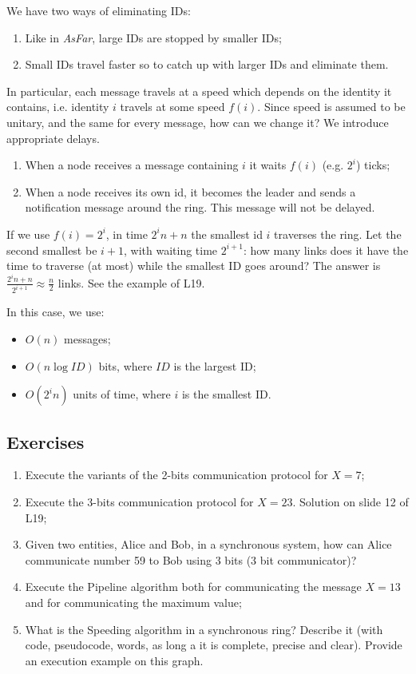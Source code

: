 We have two ways of eliminating IDs:
\begin{enumerate}
    \item Like in \textit{AsFar}, large IDs are stopped by smaller IDs;
    \item Small IDs travel faster so to catch up with larger IDs and eliminate them.
\end{enumerate}

In particular, each message travels at a speed which depends on the identity it contains, i.e. identity $i$ travels at some speed $f(i)$. Since speed is assumed to be unitary, and the same for every message, how can we change it? We introduce appropriate delays.

\begin{enumerate}
    \item When a node receives a message containing $i$ it waits $f(i)$ (e.g. $2^i$) ticks;
    \item When a node receives its own id, it becomes the leader and sends a notification message around the ring. This message will not be delayed.
\end{enumerate}

If we use $f(i) = 2^i$, in time $2^i n + n$ the smallest id $i$ traverses the ring. Let the second smallest be $i+1$, with waiting time $2^{i+1}$: how many links does it have the time to traverse (at most) while the smallest ID goes around? The answer is $\frac{2^in+n}{2^{i+1}} \approx \frac{n}{2}$ links. See the example of L19.

In this case, we use:
\begin{itemize}
    \item $O(n)$ messages;
    \item $O(n \log ID)$ bits, where $ID$ is the largest ID;
    \item $O(2^i n)$ units of time, where $i$ is the smallest ID.
\end{itemize}

\newpage
\subsection{Exercises}
\begin{enumerate}
    \item Execute the variants of the 2-bits communication protocol for $X = 7$;
    \item Execute the 3-bits communication protocol for $X = 23$. Solution on slide 12 of L19;
    \item Given two entities, Alice and Bob, in a synchronous system, how can Alice communicate number 59 to Bob using 3 bits (3 bit communicator)?
    \item Execute the Pipeline algorithm both for communicating the message $X = 13$ and for communicating the maximum value;
    \item What is the Speeding algorithm in a synchronous ring? Describe it (with code, pseudocode, words, as long a it is complete, precise and clear). Provide an execution example on this graph.
\end{enumerate}
